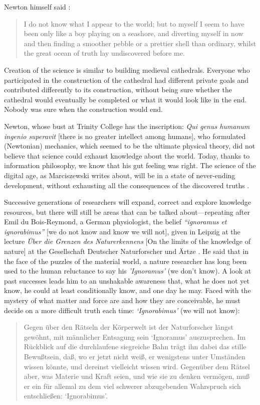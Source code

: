 \documentclass[pdftex,12pt]{article}
\begin{document}
Newton himself said \parencite[p.407]{Brewster1855}: \begin{quote} \small I do not know what I appear to the world; but to myself I seem to have been only like a boy playing on a seashore, and diverting myself in now and then finding a smoother pebble or a prettier shell than ordinary, whilst the great ocean of truth lay undiscovered before me. \end{quote}

Creation of the science is similar to building medieval cathedrals. Everyone who participated in the construction of the cathedral had different private goals and contributed differently to its construction, without being sure whether the cathedral would eventually be completed or what it would look like in the end. Nobody was sure when the construction would end.

Newton, whose bust at Trinity College has the inscription: \emph{Qui genus humanum ingenio superavit} [there is no greater intellect among humans], who formulated (Newtonian) mechanics, which seemed to be the ultimate physical theory, did not believe that science could exhaust knowledge about the world. Today, thanks to information philosophy, we know that his gut feeling was right. The science of the digital age, as Marciszewski  writes about, will be in a state of never-ending development, without exhausting all the consequences of the discovered truths \parencite{MarciszewskiStacewicz2011}.

Successive generations of researchers will expand, correct and explore knowledge resources, but there will still be areas that can be talked about---repeating after Emil du Bois-Reymond, a German physiologist, the belief \emph{``ignoramus et ignorabimus''} [we do not know and know we will not], given in Leipzig at the lecture \emph{{\"U}ber die Grenzen des Naturerkennens} [On the limits of the knowledge of nature]  at the Gesellschaft Deutscher Naturforscher und {\"A}rtze \parencite{DuboisReymond1872,DuboisReymond1882}. He said that in the face of the puzzles of the material world, a nature researcher has long been used to the human reluctance to say his \emph{'Ignoramus'} (we don't know). A look at past successes leads him to an unshakable awareness that, what he does not yet know, he could at least conditionally know, and one day he may. Faced with the mystery of what matter and force are and how they are conceivable, he must decide on a more difficult truth each time: \emph{`Ignorabimus'} (we will not know): \begin{quote} \small Gegen {\"u}ber den R{\"a}tseln der K{\"o}rperwelt ist der Naturforscher l{\"a}ngst gew{\"o}hnt, mit m{\"a}nnlicher Entsagung sein `Ignoramus' auszusprechen. Im R{\"u}ckblick auf die durchlaufene siegreiche Bahn tr{\"a}gt ihn dabei das stille Bewu{\ss}tsein, da{\ss}, wo er jetzt nicht wei{\ss}, er wenigstens unter Umst{\"a}nden wissen könnte, und dereinst vielleicht wissen wird. Gegen{\"u}ber dem R{\"a}tsel aber, was Materie und Kraft seien, und wie sie zu denken verm{\"o}gen, mu{\ss} er ein f{\"u}r allemal zu dem viel schwerer abzugebenden Wahrspruch sich entschlie{\ss}en: `Ignorabimus'. \end{quote}
\end{document}
